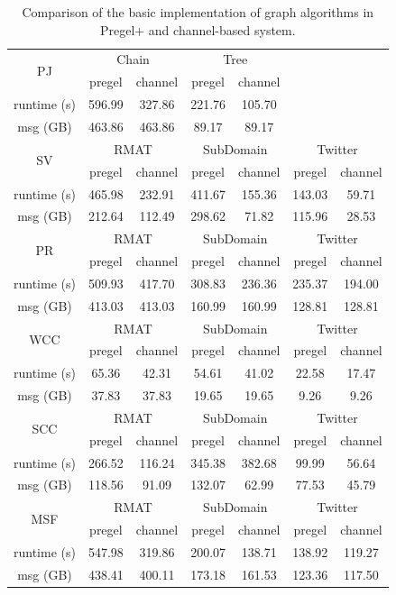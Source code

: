 \documentclass{sokendai_thesis} %
\begin{document}
\begin{table}[t]
\centering
\caption{Comparison of the basic implementation of graph algorithms in Pregel+ and channel-based system.}
\label{tab:eval-cmp}
\begin{tabular}{c|c|c|c|c|c|c}
\hline
\multirow{2}{*}{PJ} & \multicolumn{2}{|c}{Chain} & \multicolumn{2}{|c|}{Tree} \\
\cline{2-7}
 & pregel & channel & pregel & channel \\
\hline
runtime (s) & 596.99 & 327.86 & 221.76 & 105.70 \\
\hline
msg (GB) & 463.86 & 463.86 & 89.17 & 89.17 \\
\hline
\hline
\multirow{2}{*}{SV} & \multicolumn{2}{|c}{RMAT} & \multicolumn{2}{|c}{SubDomain} & \multicolumn{2}{|c}{Twitter} \\
\cline{2-7}
 & pregel & channel & pregel & channel & pregel & channel \\
\hline
runtime (s) & 465.98 & 232.91 & 411.67 & 155.36 & 143.03 & 59.71 \\
\hline
msg (GB) & 212.64 & 112.49 & 298.62 & 71.82 & 115.96 & 28.53 \\
\hline
\hline
\multirow{2}{*}{PR} & \multicolumn{2}{|c}{RMAT} & \multicolumn{2}{|c}{SubDomain} & \multicolumn{2}{|c}{Twitter} \\
\cline{2-7}
 & pregel & channel & pregel & channel & pregel & channel \\
\hline
runtime (s) & 509.93 & 417.70 & 308.83 & 236.36 & 235.37 & 194.00 \\
\hline
msg (GB) & 413.03 & 413.03 & 160.99 & 160.99 & 128.81 & 128.81 \\
\hline
\hline
\multirow{2}{*}{WCC} & \multicolumn{2}{|c}{RMAT} & \multicolumn{2}{|c}{SubDomain} & \multicolumn{2}{|c}{Twitter} \\
\cline{2-7}
 & pregel & channel & pregel & channel & pregel & channel \\
\hline
runtime (s) & 65.36 & 42.31 & 54.61 & 41.02 & 22.58 & 17.47 \\
\hline
msg (GB) & 37.83 & 37.83 & 19.65 & 19.65 & 9.26 & 9.26 \\
\hline
\hline
\multirow{2}{*}{SCC} & \multicolumn{2}{|c}{RMAT} & \multicolumn{2}{|c}{SubDomain} & \multicolumn{2}{|c}{Twitter} \\
\cline{2-7}
 & pregel & channel & pregel & channel & pregel & channel \\
\hline
runtime (s) & 266.52 & 116.24 & 345.38 & 382.68 & 99.99 & 56.64 \\
\hline
msg (GB) & 118.56 & 91.09 & 132.07 & 62.99 & 77.53 & 45.79 \\
\hline
\hline
\multirow{2}{*}{MSF} & \multicolumn{2}{|c}{RMAT} & \multicolumn{2}{|c}{SubDomain} & \multicolumn{2}{|c}{Twitter} \\
\cline{2-7}
 & pregel & channel & pregel & channel & pregel & channel \\
\hline
runtime (s) & 547.98 & 319.86 & 200.07 & 138.71 & 138.92 & 119.27 \\
\hline
msg (GB) & 438.41 & 400.11 & 173.18 & 161.53 & 123.36 & 117.50 \\
\hline
\end{tabular}
\end{table}
\end{document}
